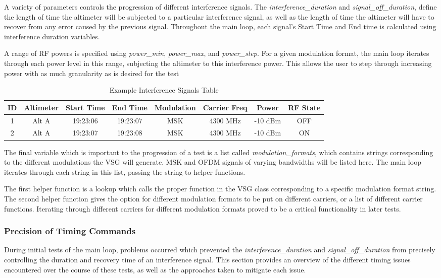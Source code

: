 A variety of parameters controls the progression of different interference signals. The \textit{interference\_duration} and \textit{signal\_off\_duration}, define the length of time the altimeter will be subjected to a particular interference signal, as well as the length of time the altimeter will have to recover from any error caused by the previous signal. Throughout the main loop, each signal's Start Time and End time is calculated using interference duration variables. 

 A range of RF powers is specified using \textit{power\_min}, \textit{power\_max}, and \textit{power\_step}. For a given modulation format, the main loop iterates through each power level in this range, subjecting the altimeter to this interference power. This allows the user to step through increasing power with as much granularity as is desired for the test

\begin{table}[]
\centering
\begin{tabular}{@{}cccccccc@{}}
\toprule
ID & Altimeter   & Start Time          & End Time            & Modulation &Carrier Freq& Power & RF State \\ \midrule
1  & Alt A & 19:23:06 & 19:23:07 & MSK & 4300  MHz & -10  dBm & OFF      \\
2  & Alt A & 19:23:07 & 19:23:08 & MSK & 4300   MHz & -10 dBm& ON       \\ \bottomrule
\end{tabular}
\caption{Example Interference Signals Table}
\label{tab:Interference}
\end{table}

The final variable which is important to the progression of a test is a list called \textit{modulation\_formats}, which contains strings corresponding to the different modulations the VSG will generate. MSK and OFDM signals of varying bandwidths will be listed here. The main loop iterates through each string in this list, passing the string to helper functions. 

The first helper function is a lookup which calls the proper function in the VSG class corresponding to a specific modulation format string. The second helper function gives the option for different modulation formats to be put on different carriers, or a list of different carrier functions. Iterating through different carriers for different modulation formats proved to be a critical functionality in later tests.

\subsubsection{Precision of Timing Commands}\label{subsub:timing}
During initial tests of the main loop, problems occurred which prevented the \textit{interference\_duration} and \textit{signal\_off\_duration} from precisely controlling the duration and recovery time of an interference signal. This section provides an overview of the different timing issues encountered over the course of these tests, as well as the approaches taken to mitigate each issue. 
 
